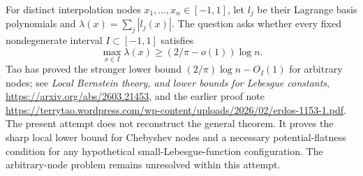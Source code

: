 For distinct interpolation nodes $x_1,\ldots,x_n\in[-1,1]$, let $l_j$ be their Lagrange basis polynomials and $\lambda(x)=\sum_j|l_j(x)|$. The question asks whether every fixed nondegenerate interval $I\subset[-1,1]$ satisfies
\[
 \max_{x\in I}\lambda(x)\ge(2/\pi-o(1))\log n.
\]
Tao has proved the stronger lower bound $(2/\pi)\log n-O_I(1)$ for arbitrary nodes; see \emph{Local Bernstein theory, and lower bounds for Lebesgue constants}, \url{https://arxiv.org/abs/2603.21453}, and the earlier proof note \url{https://terrytao.wordpress.com/wp-content/uploads/2026/02/erdos-1153-1.pdf}. The present attempt does not reconstruct the general theorem. It proves the sharp local lower bound for Chebyshev nodes and a necessary potential-flatness condition for any hypothetical small-Lebesgue-function configuration. The arbitrary-node problem remains unresolved within this attempt.
